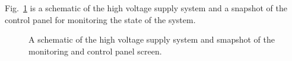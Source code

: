 Fig.~\ref{dc-high-voltage-system} is a schematic of the high voltage
supply system and a snapshot 
of the control panel for monitoring the state of the system.

\begin{figure}
\vspace{4.5cm}
\caption{\small{A schematic of the high voltage supply system and smapshot of 
the monitoring and control panel screen.}}
\label{dc-high-voltage-system}
\end{figure}   


